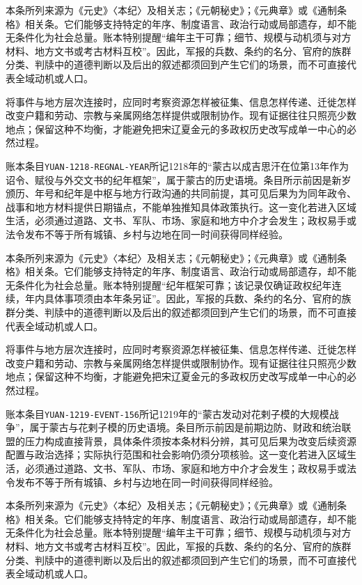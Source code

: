 本条所列来源为《元史》〈本纪〉及相关志；《元朝秘史》；《元典章》或《通制条格》相关条。它们能够支持特定的年序、制度语言、政治行动或局部遗存，却不能无条件化为社会总量。账本特别提醒“编年主干可靠；细节、规模与动机须与对方材料、地方文书或考古材料互校”。因此，军报的兵数、条约的名分、官府的族群分类、判牍中的道德判断以及后出的叙述都须回到产生它们的场景，而不可直接代表全域动机或人口。

将事件与地方层次连接时，应同时考察资源怎样被征集、信息怎样传递、迁徙怎样改变户籍和劳动、宗教与亲属网络怎样提供或限制协作。现有证据往往只照亮少数地点；保留这种不均衡，才能避免把宋辽夏金元的多政权历史改写成单一中心的必然过程。

账本条目\texttt{YUAN-1218-REGNAL-YEAR}所记1218年的“蒙古以成吉思汗在位第13年作为诏令、赋役与外交文书的纪年框架”，属于蒙古的历史语境。条目所示前因是新岁颁历、年号和纪年是中枢与地方行政沟通的共同前提，其可见后果为为同年政令、战事和地方材料提供日期锚点，不能单独推知具体政策执行。这一变化若进入区域生活，必须通过道路、文书、军队、市场、家庭和地方中介才会发生；政权易手或法令发布不等于所有城镇、乡村与边地在同一时间获得同样经验。

本条所列来源为《元史》〈本纪〉及相关志；《元朝秘史》；《元典章》或《通制条格》相关条。它们能够支持特定的年序、制度语言、政治行动或局部遗存，却不能无条件化为社会总量。账本特别提醒“纪年框架可靠；该记录仅确证政权纪年连续，年内具体事项须由本年条另证”。因此，军报的兵数、条约的名分、官府的族群分类、判牍中的道德判断以及后出的叙述都须回到产生它们的场景，而不可直接代表全域动机或人口。

将事件与地方层次连接时，应同时考察资源怎样被征集、信息怎样传递、迁徙怎样改变户籍和劳动、宗教与亲属网络怎样提供或限制协作。现有证据往往只照亮少数地点；保留这种不均衡，才能避免把宋辽夏金元的多政权历史改写成单一中心的必然过程。

账本条目\texttt{YUAN-1219-EVENT-156}所记1219年的“蒙古发动对花剌子模的大规模战争”，属于蒙古与花剌子模的历史语境。条目所示前因是前期边防、财政和统治联盟的压力构成直接背景，具体条件须按本条材料分辨，其可见后果为改变后续资源配置与政治选择；实际执行范围和社会影响仍须分项核验。这一变化若进入区域生活，必须通过道路、文书、军队、市场、家庭和地方中介才会发生；政权易手或法令发布不等于所有城镇、乡村与边地在同一时间获得同样经验。

本条所列来源为《元史》〈本纪〉及相关志；《元朝秘史》；《元典章》或《通制条格》相关条。它们能够支持特定的年序、制度语言、政治行动或局部遗存，却不能无条件化为社会总量。账本特别提醒“编年主干可靠；细节、规模与动机须与对方材料、地方文书或考古材料互校”。因此，军报的兵数、条约的名分、官府的族群分类、判牍中的道德判断以及后出的叙述都须回到产生它们的场景，而不可直接代表全域动机或人口。

